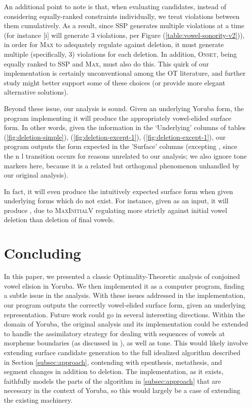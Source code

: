 \documentclass[12pt]{article}
\newcommand{\maxplusv}{\textsc{MaxInitialV}}
\newcommand{\maxc}{\textsc{Max}}
\newcommand{\ssp}{\textsc{SSP}}
\newcommand{\onset}{\textsc{Onset}}
\newcommand{\pref}[1]{(\ref{#1})}
\begin{document}
An additional point to note is that, when evaluating candidates,
instead of considering equally-ranked constraints individually, we
treat violations between them cumulatively. As a result, since
\ssp{} generates multiple violations at a time (for instance [i]
will generate 3 violations, per Figure
\pref{table:vowel-sonority-v2}), in order for \maxc{} to
adequately regulate against deletion, it must generate multiple
(specifically, 3) violations for each deletion. In addition,
\onset{}, being equally ranked to \ssp{} and \maxc{}, must also
do this. This quirk of our implementation is certainly
unconventional among the OT literature, and further study might
better support some of these choices (or provide more elegant
alternative solutions).

Beyond these issue, our analysis is sound. Given an underlying
Yoruba form, the program implementing it will produce the
appropriately vowel-elided surface form. In other words, given
the information in the `Underlying' columns of tables
\pref{fig:deletion-simple}, \pref{fig:deletion-except-1},
\pref{fig:deletion-except-1}, our program outputs the
form expected in the 'Surface' columns (excepting
 \rightarrow{} \textipa{[l\'oko]},
since the n \rightarrow{} l transition occurs for reasons
unrelated to our analysis; we also ignore tone markers
here, because it is a related but orthogonal phenomenon
unhandled by our original analysis).

In fact, it will even produce the intuitively expected surface
form when given underlying forms which do not exist. For
instance, given \textipa{[so-el\'u]} as an input, it will produce
, due to \maxplusv{} regulating more
strictly against initial vowel deletion than deletion of
final vowels.

\section{Concluding}

In this paper, we presented a classic Optimality-Theoretic
analysis of conjoined vowel elision in Yoruba. We then
implemented it as a computer program, finding a subtle
issue in the analysis. With these issues addressed in the
implementation, our program outputs the correctly
vowel-elided surface form, given an underlying
representation. Future work could go in several interesting
directions. Within the domain of Yoruba, the original
analysis and its implementation could be extended to handle
the assimilatory strategy for dealing with sequences of
vowels at morpheme boundaries (as discussed in
\cite{ola2002yoruba}), as well as tone. This would likely
involve extending surface candidate generation to the full
idealized algorithm described in Section
\ref{subsec:approach}, contending with epenthesis,
metathesis, and segment changes in addition to deletion.
The implementation, as it exists, faithfully models the
parts of the algorithm in \ref{subsec:approach} that are
necessary in the context of Yoruba, so this would largely
be a case of extending the existing machinery.
\end{document}
